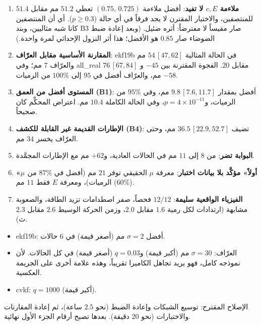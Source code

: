 \documentclass[11pt,a4paper]{article}
\newcommand{\en}[1]{\textenglish{#1}}
\begin{document}
\begin{enumerate}
\item \textbf{ملاءمة $c,E$ لا تفيد}: أفضل ملاءمة $(0.75,\,0.725)$ تعطي $51.2$ مم مقابل $51.4$ للمنتصفين، والاختبار المقترن لا يجد فرقاً
في أي حالة ($p\ge0.3$). أي أن المنتصفين كانا شبه مثاليين، وبند \en{B3} صار مقيساً لا مفترضاً: أثره ضئيل. (وبعد إعادة ضبط
الضوضاء صار $0.85$ هو الأفضل؛ هذا أثر النزول الإحداثي لمرة واحدة.)
\item \textbf{المقارنة الأساسية مقابل العرّاف}: \en{ekf19b} في الحالة المثالية $54\,[47,62]$ مم والعرّاف $7$ مم؛ وفي
\en{all\_real} $76\,[67,84]$ مقابل $20$. الفجوة المقترنة بين $-45$ و$-58$ مم، والعرّاف أفضل في $95$ إلى $100\%$ من الرميات.
\item \textbf{المستوى أفضل من العمق (\en{B1})}: أفضل بمقدار $9.8\,[7.6,11.7]$ مم، وفي $95\%$ من الرميات، و$p=4\times10^{-11}$،
وفي الحالة الكاملة $10.4$ مم. اعتراض المحكِّم كان صحيحاً.
\item \textbf{الإطارات القديمة غير القابلة للكشف (\en{B4})}: تضيف $36.5\,[22.9,52.7]$ مم، وحتى العرّاف يخسر $34$ مم.
\item \textbf{البوابة تضر}: من $8$ إلى $11$ مم في الحالات العادية، و$+62$ مم مع الإطارات المجمَّدة.
\item \textbf{«$\mu$ أولاً» مؤكَّد بلا بيانات اختبار}: معرفة $\mu$ الحقيقي توفر $21$ مم (أفضل في $87\%$ من الرميات)، ومعرفة
$E$ فقط $11$ مم ($60\%$).
\item \textbf{الفيزياء الواقعية سليمة}: $12/12$ فحصاً، صفر اصطدامات تزيد الطاقة، والصعوبة مشابهة (ارتدادات لكل رمية $1.6$ مقابل
$2.0$، وزمن الحركة الوسيط $2.6$ مقابل $2.3$ ث).
\end{enumerate}

\begin{warn}
\begin{itemize}
\item \en{ekf19b}: أفضل $\sigma=2$ مم (أصغر قيمة) في $6$ حالات.
\item العرّاف: $\sigma=30$ مم (أكبر قيمة) و$q=0.03$ (أصغر قيمة) في كل الحالات. لأن نموذجه كامل، فهو يريد تجاهل الكاميرا تقريباً،
وهذه علامة أخرى على الجريمة العكسية.
\item \en{cvkf}: $q=1000$ (أكبر قيمة).
\end{itemize}
الإصلاح المقترح: توسيع الشبكات وإعادة الضبط (نحو $2.5$ ساعة)، ثم إعادة المقارنات والاختبارات (نحو $20$ دقيقة). بعدها تصبح أرقام
الجزء الأول نهائية.
\end{warn}

\end{document}
